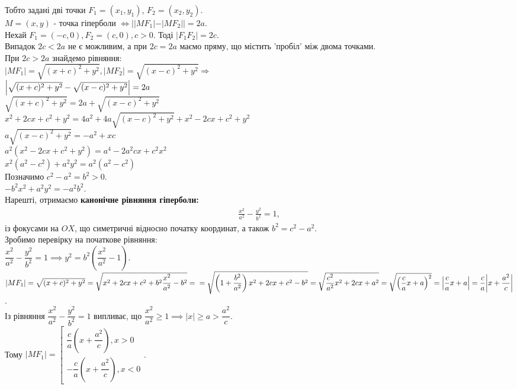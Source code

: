 \documentclass[a4paper, 10pt]{extarticle}
\theoremstyle{theoremdd}
\theoremstyle{theoremdd}
\theoremstyle{theoremdd}
\theoremstyle{theoremdd}
\theoremstyle{theoremdd}
\theoremstyle{theoremdd}
\theoremstyle{theoremdd}
\theoremstyle{theoremdd}
\begin{document}
Тобто задані дві точки $F_1 = (x_1,y_1)$, $F_2 = (x_2,y_2)$.\\
$M = (x,y)$ - точка гіперболи $\iff ||MF_1|-|MF_2|| = 2a$.
\bigskip \\
Нехай $F_1 = (-c,0), F_2 = (c,0), c>0$. Тоді $|F_1F_2| = 2c$.\\
Випадок $2c<2a$ не є можливим, а при $2c = 2a$ маємо пряму, що містить 'пробіл' між двома точками.\\
При $2c>2a$ знайдемо рівняння:\\
$|MF_1|=\sqrt{(x+c)^2+y^2}, |MF_2|=\sqrt{(x-c)^2+y^2} \Rightarrow$\\
$\abs{\sqrt{(x+c)^2+y^2}-\sqrt{(x-c)^2+y^2}}=2a$\\
$\sqrt{(x+c)^2+y^2} = 2a + \sqrt{(x-c)^2+y^2}$\\
$x^2+2cx+c^2+y^2=4a^2+4a\sqrt{(x-c)^2+y^2}+x^2-2cx+c^2+y^2$\\
$a\sqrt{(x-c)^2+y^2}=-a^2+xc$\\
$a^2(x^2-2cx+c^2+y^2)=a^4-2a^2cx+c^2x^2$\\
$x^2(a^2-c^2)+a^2y^2=a^2(a^2-c^2)$\\
Позначимо $c^2-a^2=b^2>0$.\\
$-b^2x^2+a^2y^2=-a^2b^2$.\\
Нарешті, отримаємо \textbf{канонічне рівняння гіперболи:}
\begin{align*}
\frac{x^2}{a^2} - \frac{y^2}{b^2} = 1,
\end{align*}
із фокусами на $OX$, що симетричні відносно початку координат, а також $b^2 = c^2 - a^2$.
\bigskip \\
Зробимо перевірку на початкове рівняння:\\
$\dfrac{x^2}{a^2} - \dfrac{y^2}{b^2} = 1 \implies y^2 = b^2 \left(\dfrac{x^2}{a^2} -1 \right)$.\\
$|MF_1| = \sqrt{(x+c)^2+y^2} = \sqrt{x^2+2cx+c^2+b^2\dfrac{x^2}{a^2} - b^2} = \\
= \sqrt{\left(1 + \dfrac{b^2}{a^2} \right)x^2 + 2cx + c^2 - b^2} = \sqrt{\dfrac{c^2}{a^2}x^2 + 2cx + a^2} = \sqrt{\left(\dfrac{c}{a}x + a \right)^2} = \abs{\dfrac{c}{a}x + a} = \dfrac{c}{a} \abs{x + \dfrac{a^2}{c}}$.\\
Із рівняння $\dfrac{x^2}{a^2} - \dfrac{y^2}{b^2} = 1$ випливає, що $\dfrac{x^2}{a^2} \geq 1 \implies |x| \geq a > \dfrac{a^2}{c}$.\\
Тому $|MF_1| = \left[ \begin{gathered} \dfrac{c}{a} \left(x + \dfrac{a^2}{c} \right), x > 0 \\ -\dfrac{c}{a} \left(x + \dfrac{a^2}{c} \right), x < 0 \end{gathered} \right.$.\\
\end{document}
